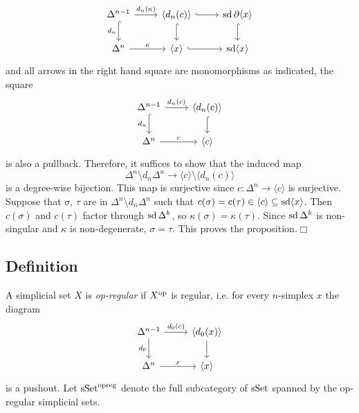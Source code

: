        \begin{equation*}
            \begin{tikzcd}
                \Delta^{n-1} \arrow[d, hook, "d_n"'] \arrow[r, "{d_n(\kappa)}"] & \langle d_n(c) \rangle \arrow[d, hook] \arrow[r, hook] & \sd \partial \langle x \rangle \arrow[d, hook] \\
                \Delta^n \arrow[r, "\kappa"] & \langle x \rangle \arrow[r, hook] & \sd \langle x \rangle
            \end{tikzcd}
        \end{equation*}
        and all arrows in the right hand square are monomorphisms as indicated, the square
        \begin{equation*}
            \begin{tikzcd}
                \Delta^{n-1} \arrow[d, hook, "d_n"'] \arrow[r, "{d_n(c)}"] & \langle d_n(c) \rangle \arrow[d, hook] \\
                \Delta^n \arrow[r, "c"] & \langle c \rangle
            \end{tikzcd}
        \end{equation*}
        is also a pullback. Therefore, it suffices to show that the induced map
        \begin{equation*}
            \Delta^n \setminus d_n \Delta^n \to \langle c \rangle \setminus \langle d_n(c) \rangle 
        \end{equation*}
        is a degree-wise bijection. This map is surjective since $c \colon \Delta^n \to \langle c \rangle$ is surjective.\\
        Suppose that $\sigma$, $\tau$ are in $\Delta^n \setminus d_n \Delta^n$ such that $c(\sigma) = c(\tau) \in \langle c \rangle \subseteq \operatorname{sd} \langle x \rangle$. Then $c(\sigma)$ and $c(\tau)$ factor through $\operatorname{sd} \Delta^k$, so $\kappa(\sigma) = \kappa(\tau)$. Since $\operatorname{sd} \Delta^k$ is non-singular and $\kappa$ is non-degenerate, $\sigma = \tau$. This proves the proposition.\hfill$\Box$

    \subsection{Definition}\label{chV-5-18}
        A simplicial set $X$ is \emph{op-regular} if $X^{\operatorname{op}}$ is regular, i.e. for every $n$-simplex $x$ the diagram
        \begin{equation*}
            \begin{tikzcd}
                \Delta^{n-1} \arrow[d, "d_0"'] \arrow[r, "{d_0(c)}"] & \langle d_0(x) \rangle \arrow[d] \\
                \Delta^n \arrow[r, "x"] & \langle x \rangle
            \end{tikzcd}
        \end{equation*}
        is a pushout. Let $\operatorname{sSet}^{\operatorname{opreg}}$ denote the full subcategory of $\operatorname{sSet}$ spanned by the op-regular simplicial sets.

